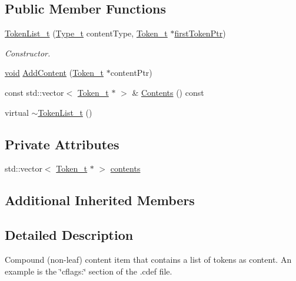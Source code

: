 \subsection*{Public Member Functions}
\begin{DoxyCompactItemize}
\item 
\hyperlink{structparse_tree_1_1_token_list__t_aad5f93916196d2eb3ef0330aa1741194}{Token\+List\+\_\+t} (\hyperlink{structparse_tree_1_1_content__t_a45cc4a193beac87a2045a2f6b6870d1b}{Type\+\_\+t} content\+Type, \hyperlink{structparse_tree_1_1_token__t}{Token\+\_\+t} $\ast$\hyperlink{structparse_tree_1_1_compound_item__t_a587020c943e760cb0152dd8cd31e21ef}{first\+Token\+Ptr})
\begin{DoxyCompactList}\small\item\em Constructor. \end{DoxyCompactList}\item 
\hyperlink{_t_e_m_p_l_a_t_e__cdef_8h_ac9c84fa68bbad002983e35ce3663c686}{void} \hyperlink{structparse_tree_1_1_token_list__t_aed35d561e8810fea3c0a21f791409cfb}{Add\+Content} (\hyperlink{structparse_tree_1_1_token__t}{Token\+\_\+t} $\ast$content\+Ptr)
\item 
const std\+::vector$<$ \hyperlink{structparse_tree_1_1_token__t}{Token\+\_\+t} $\ast$ $>$ \& \hyperlink{structparse_tree_1_1_token_list__t_aa2de5c550b510aec155218c0ea2e4a0c}{Contents} () const 
\item 
virtual \hyperlink{structparse_tree_1_1_token_list__t_a5c8e75a9c5e30d89042586e3c67fbbb7}{$\sim$\+Token\+List\+\_\+t} ()
\end{DoxyCompactItemize}
\subsection*{Private Attributes}
\begin{DoxyCompactItemize}
\item 
std\+::vector$<$ \hyperlink{structparse_tree_1_1_token__t}{Token\+\_\+t} $\ast$ $>$ \hyperlink{structparse_tree_1_1_token_list__t_a2a0245f7080d7e6f55b768527f260f35}{contents}
\end{DoxyCompactItemize}
\subsection*{Additional Inherited Members}


\subsection{Detailed Description}
Compound (non-\/leaf) content item that contains a list of tokens as content. An example is the \char`\"{}cflags\+:\char`\"{} section of the .cdef file. 

